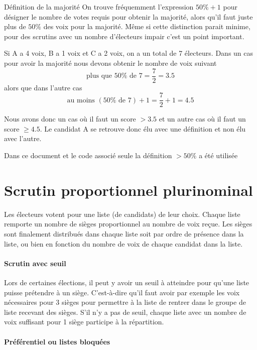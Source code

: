 \documentclass[../report]{subfiles}
\begin{document}
  \begin{important}[$50\% + 1$ versus $ > 50\%$]{Définition de la majorité}
    On trouve fréquemment l'expression $50\%+1$ pour désigner le nombre de votes requis pour
    obtenir la majorité, alors qu'il faut juste plus de $50\%$ des voix pour la majorité.
    Même si cette distinction parait minime, pour des scrutins avec un nombre d'électeurs 
    impair c'est un point important.

    Si A a 4 voix, B a 1 voix et C a 2 voix, on a un total de 7 électeurs.
    Dans un cas pour avoir la majorité nous devons obtenir le nombre de voix suivant
    \[ \text{plus que }50\%\text{ de }7 = \frac{7}{2} = 3.5 \]
    alors que dans l'autre cas
    \[ \text{au moins }(50\%\text{ de }7) + 1 = \frac{7}{2} + 1 = 4.5 \]

    Nous avons donc un cas où il faut un score $ > 3.5 $ et un autre cas où il faut un score 
    $ \geqslant 4.5 $.
    Le candidat A se retrouve donc élu avec une définition et non élu avec l'autre.

    Dans ce document et le code associé seule la définition $> 50\%$ a été utilisée
  \end{important}

  \section{Scrutin proportionnel plurinominal}

  Les électeurs votent pour une liste (de candidats) de leur choix.
  Chaque liste remporte un nombre de sièges proportionnel au nombre de voix reçue.
  Les sièges sont finalement distribués dans chaque liste soit par ordre de présence dans
  la liste, ou bien en fonction du nombre de voix de chaque candidat dans la liste.

  \paragraph{Scrutin avec seuil}

  Lors de certaines élections, il peut y avoir un seuil à atteindre pour qu'une liste puisse 
  prétendre à un siège.
  C'est-à-dire qu'il faut avoir par exemple les voix nécessaires pour 3 sièges pour permettre
  à la liste de rentrer dans le groupe de liste recevant des sièges.
  S'il n'y a pas de seuil, chaque liste avec un nombre de voix suffisant pour 1 siège participe 
  à la répartition.
  
  \paragraph{Préférentiel ou listes bloquées}
\end{document}
